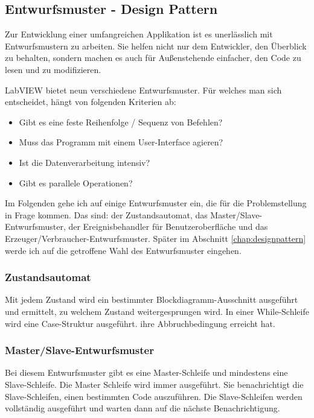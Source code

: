 	\subsection{Entwurfsmuster - Design Pattern}
	\label{chap:entwurfsmuster}
Zur Entwicklung einer umfangreichen Applikation ist es unerlässlich mit Entwurfsmustern zu arbeiten. 
Sie helfen nicht nur dem Entwickler, den Überblick  zu behalten, sondern machen es auch für Außenstehende einfacher, den Code zu lesen und zu modifizieren.

LabVIEW bietet neun verschiedene Entwurfsmuster. Für welches man sich entscheidet, hängt von folgenden Kriterien ab:
\begin{itemize}
	\item Gibt es eine feste Reihenfolge / Sequenz von Befehlen?
	\item Muss das Programm mit einem User-Interface agieren?
	\item Ist die Datenverarbeitung intensiv? 
	\item Gibt es parallele Operationen?
\end{itemize}

Im Folgenden gehe ich auf einige Entwurfsmuster ein, die für die Problemstellung in Frage kommen. Das sind: der Zustandsautomat, das Master/Slave-Entwurfsmuster, 
der Ereignisbehandler für Benutzeroberfläche und das Erzeuger/Verbraucher-Entwurfsmuster. Später im Abschnitt \ref{chap:designpattern} werde ich auf die getroffene Wahl des Entwurfsmuster eingehen.

\subsubsection{Zustandsautomat}%
Mit jedem Zustand wird ein bestimmter Blockdiagramm-Ausschnitt ausgeführt und ermittelt, zu welchem Zustand weitergesprungen wird. 
In einer While-Schleife wird eine Case-Struktur ausgeführt. 
ihre Abbruchbedingung erreicht hat.
	
\subsubsection{Master/Slave-Entwurfsmuster}
Bei diesem Entwurfsmuster gibt es eine Master-Schleife und mindestens eine Slave-Schleife. Die Master Schleife wird immer ausgeführt. 
Sie benachrichtigt die Slave-Schleifen, einen bestimmten Code auszuführen. 
Die Slave-Schleifen werden vollständig ausgeführt und warten dann auf die nächste Benachrichtigung.

